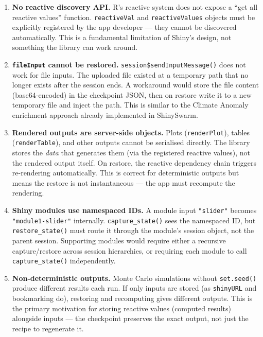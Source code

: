 \documentclass[11pt,a4paper]{article}
\begin{document}
\begin{enumerate}[nosep]
  \item \textbf{No reactive discovery API.} R's reactive system does not expose
        a ``get all reactive values'' function. \texttt{reactiveVal} and
        \texttt{reactiveValues} objects must be explicitly registered by the app
        developer --- they cannot be discovered automatically. This is a
        fundamental limitation of Shiny's design, not something the library can
        work around.

  \item \textbf{\texttt{fileInput} cannot be restored.}
        \texttt{session\$sendInputMessage()} does not work for file inputs.
        The uploaded file existed at a temporary path that no longer exists
        after the session ends. A workaround would store the file content
        (base64-encoded) in the checkpoint JSON, then on restore write it to a
        new temporary file and inject the path. This is similar to the Climate
        Anomaly enrichment approach already implemented in ShinySwarm.

  \item \textbf{Rendered outputs are server-side objects.} Plots
        (\texttt{renderPlot}), tables (\texttt{renderTable}), and other outputs
        cannot be serialised directly. The library stores the \emph{data} that
        generates them (via the registered reactive values), not the rendered
        output itself. On restore, the reactive dependency chain triggers
        re-rendering automatically. This is correct for deterministic outputs
        but means the restore is not instantaneous --- the app must recompute
        the rendering.

  \item \textbf{Shiny modules use namespaced IDs.} A module input
        \texttt{"slider"} becomes \texttt{"module1-slider"} internally.
        \texttt{capture\_state()} sees the namespaced ID, but
        \texttt{restore\_state()} must route it through the module's session
        object, not the parent session. Supporting modules would require either
        a recursive capture/restore across session hierarchies, or requiring
        each module to call \texttt{capture\_state()} independently.

  \item \textbf{Non-deterministic outputs.} Monte Carlo simulations without
        \texttt{set.seed()} produce different results each run. If only inputs
        are stored (as \texttt{shinyURL} and bookmarking do), restoring and
        recomputing gives different outputs. This is the primary motivation for
        storing reactive values (computed results) alongside inputs --- the
        checkpoint preserves the exact output, not just the recipe to
        regenerate it.
\end{enumerate}
\end{document}
